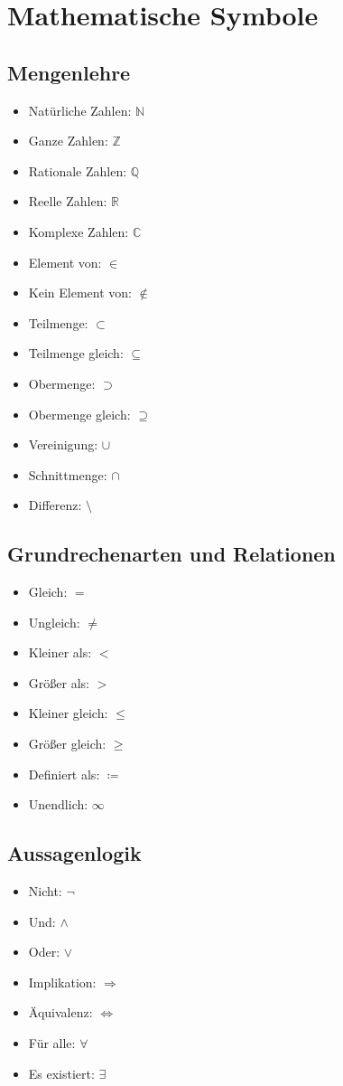 \documentclass[a4paper,10pt]{article}
\begin{document}
\section{Mathematische Symbole}

\subsection{Mengenlehre}
\begin{itemize}
    \item Natürliche Zahlen: $\mathbb{N}$
    \item Ganze Zahlen: $\mathbb{Z}$
    \item Rationale Zahlen: $\mathbb{Q}$
    \item Reelle Zahlen: $\mathbb{R}$
    \item Komplexe Zahlen: $\mathbb{C}$
    \item Element von: $\in$
    \item Kein Element von: $\notin$
    \item Teilmenge: $\subset$
    \item Teilmenge gleich: $\subseteq$
    \item Obermenge: $\supset$
    \item Obermenge gleich: $\supseteq$
    \item Vereinigung: $\cup$
    \item Schnittmenge: $\cap$
    \item Differenz: $\setminus$
\end{itemize}

\subsection{Grundrechenarten und Relationen}
\begin{itemize}
    \item Gleich: $=$
    \item Ungleich: $\neq$
    \item Kleiner als: $<$
    \item Größer als: $>$
    \item Kleiner gleich: $\leq$
    \item Größer gleich: $\geq$
    \item Definiert als: $\coloneqq$
    \item Unendlich: $\infty$
\end{itemize}

\subsection{Aussagenlogik}
\begin{itemize}
    \item Nicht: $\neg$
    \item Und: $\wedge$
    \item Oder: $\vee$
    \item Implikation: $\Rightarrow$
    \item Äquivalenz: $\Leftrightarrow$
    \item Für alle: $\forall$
    \item Es existiert: $\exists$
\end{itemize}
\end{document}
